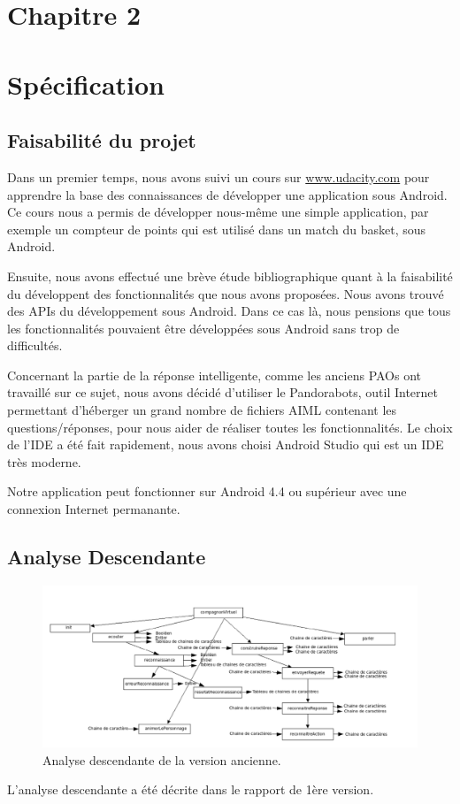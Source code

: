 \section*{Chapitre 2}
\section{Spécification}
\subsection{Faisabilité du projet}
Dans un premier temps, nous avons suivi un cours sur \url{www.udacity.com} pour apprendre la base des connaissances de développer une application sous Android. Ce cours nous a permis de développer nous-même une simple application, par exemple un compteur de points qui est utilisé dans un match du basket, sous Android. 

\indent Ensuite, nous avons effectué une brève étude bibliographique quant à la faisabilité du développent des fonctionnalités que nous avons proposées. Nous avons trouvé des APIs du développement sous Android. Dans ce cas là, nous pensions que tous les fonctionnalités pouvaient être développées sous Android sans trop de difficultés.

\indent Concernant la partie de la réponse intelligente, comme les anciens PAOs ont travaillé sur ce sujet, nous avons décidé d'utiliser le Pandorabots, outil Internet permettant d'héberger un grand nombre de fichiers AIML contenant les questions/réponses, pour nous aider de réaliser toutes les fonctionnalités. Le choix de l'IDE a été fait rapidement, nous avons choisi Android Studio qui est un IDE très moderne.

\indent Notre application peut fonctionner sur Android 4.4 ou supérieur avec une connexion Internet permanante.\\

\subsection{Analyse Descendante}
\begin{figure}[h]
\centering
\includegraphics[width=1\linewidth]{analyseDescendante.png}
\caption{Analyse descendante de la version ancienne.\label{fig1}}
\end{figure}
\indent L'analyse descendante a été décrite dans le rapport de 1ère version.
\newpage
